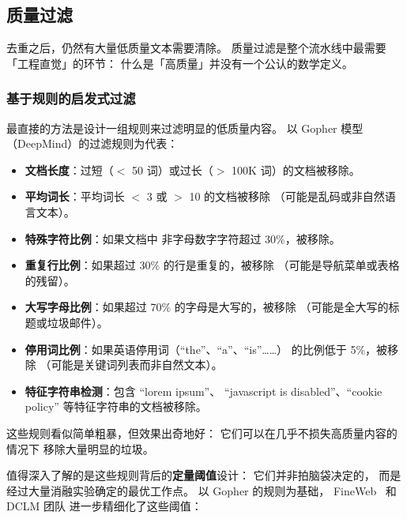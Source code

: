 \subsection{质量过滤}

去重之后，仍然有大量低质量文本需要清除。
质量过滤是整个流水线中最需要「工程直觉」的环节：
什么是「高质量」并没有一个公认的数学定义。

\subsubsection{基于规则的启发式过滤}

最直接的方法是设计一组规则来过滤明显的低质量内容。
以 Gopher 模型（DeepMind）的过滤规则为代表：

\begin{itemize}[noitemsep]
  \item \textbf{文档长度}：过短（$<$ 50 词）或过长（$>$ 100K 词）的文档被移除。
  \item \textbf{平均词长}：平均词长 $<$ 3 或 $>$ 10 的文档被移除
        （可能是乱码或非自然语言文本）。
  \item \textbf{特殊字符比例}：如果文档中
        非字母数字字符超过 30\%，被移除。
  \item \textbf{重复行比例}：如果超过 30\% 的行是重复的，被移除
        （可能是导航菜单或表格的残留）。
  \item \textbf{大写字母比例}：如果超过 70\% 的字母是大写的，被移除
        （可能是全大写的标题或垃圾邮件）。
  \item \textbf{停用词比例}：如果英语停用词（“the”、“a”、“is”……）
        的比例低于 5\%，被移除
        （可能是关键词列表而非自然文本）。
  \item \textbf{特征字符串检测}：包含 “lorem ipsum”、
        “javascript is disabled”、“cookie policy”
        等特征字符串的文档被移除。
\end{itemize}

这些规则看似简单粗暴，但效果出奇地好：
它们可以在几乎不损失高质量内容的情况下
移除大量明显的垃圾。

值得深入了解的是这些规则背后的\textbf{定量阈值}设计：
它们并非拍脑袋决定的，
而是经过大量消融实验确定的最优工作点。
以 Gopher 的规则为基础，
FineWeb~\cite{penedo2024fineweb} 和 DCLM 团队
进一步精细化了这些阈值：

